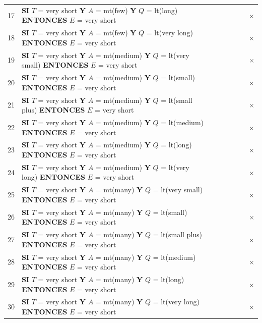 {\begin{longtable}{@{}r l ccccc c@{}}
17 & \textbf{SI} $T$ = very short \textbf{Y} $A$ = mt(few) \textbf{Y} $Q$ = lt(long) \textbf{ENTONCES} $E$ = very short &  &  &  &  &  & $\times$ \\
18 & \textbf{SI} $T$ = very short \textbf{Y} $A$ = mt(few) \textbf{Y} $Q$ = lt(very long) \textbf{ENTONCES} $E$ = very short &  &  &  &  &  & $\times$ \\
19 & \textbf{SI} $T$ = very short \textbf{Y} $A$ = mt(medium) \textbf{Y} $Q$ = lt(very small) \textbf{ENTONCES} $E$ = very short &  &  &  &  &  & $\times$ \\
20 & \textbf{SI} $T$ = very short \textbf{Y} $A$ = mt(medium) \textbf{Y} $Q$ = lt(small) \textbf{ENTONCES} $E$ = very short &  &  &  &  &  & $\times$ \\
21 & \textbf{SI} $T$ = very short \textbf{Y} $A$ = mt(medium) \textbf{Y} $Q$ = lt(small plus) \textbf{ENTONCES} $E$ = very short &  &  &  &  &  & $\times$ \\
22 & \textbf{SI} $T$ = very short \textbf{Y} $A$ = mt(medium) \textbf{Y} $Q$ = lt(medium) \textbf{ENTONCES} $E$ = very short &  &  &  &  &  & $\times$ \\
23 & \textbf{SI} $T$ = very short \textbf{Y} $A$ = mt(medium) \textbf{Y} $Q$ = lt(long) \textbf{ENTONCES} $E$ = very short &  &  &  &  &  & $\times$ \\
24 & \textbf{SI} $T$ = very short \textbf{Y} $A$ = mt(medium) \textbf{Y} $Q$ = lt(very long) \textbf{ENTONCES} $E$ = very short &  &  &  &  &  & $\times$ \\
25 & \textbf{SI} $T$ = very short \textbf{Y} $A$ = mt(many) \textbf{Y} $Q$ = lt(very small) \textbf{ENTONCES} $E$ = very short &  &  &  &  &  & $\times$ \\
26 & \textbf{SI} $T$ = very short \textbf{Y} $A$ = mt(many) \textbf{Y} $Q$ = lt(small) \textbf{ENTONCES} $E$ = very short &  &  &  &  &  & $\times$ \\
27 & \textbf{SI} $T$ = very short \textbf{Y} $A$ = mt(many) \textbf{Y} $Q$ = lt(small plus) \textbf{ENTONCES} $E$ = very short &  &  &  &  &  & $\times$ \\
28 & \textbf{SI} $T$ = very short \textbf{Y} $A$ = mt(many) \textbf{Y} $Q$ = lt(medium) \textbf{ENTONCES} $E$ = very short &  &  &  &  &  & $\times$ \\
29 & \textbf{SI} $T$ = very short \textbf{Y} $A$ = mt(many) \textbf{Y} $Q$ = lt(long) \textbf{ENTONCES} $E$ = very short &  &  &  &  &  & $\times$ \\
30 & \textbf{SI} $T$ = very short \textbf{Y} $A$ = mt(many) \textbf{Y} $Q$ = lt(very long) \textbf{ENTONCES} $E$ = very short &  &  &  &  &  & $\times$ \\

\end{longtable}}
